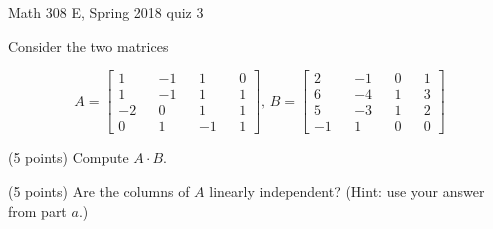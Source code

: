 \documentclass{exam}
\begin{document}
 
\begin{center} \begin{Large} Math 308 E, Spring 2018 quiz 3 \end{Large}
\end{center} 

\vspace{5mm}

\begin{center}
\end{center}

\vspace{1cm}
 

\vspace{1cm}

Consider the two matrices

\[
A = \begin{bmatrix} 1 && -1 && 1 && 0 \\ 1 && -1 && 1 && 1 \\ -2 && 0 && 1 && 1 \\ 0 && 1 && -1 && 1 \end{bmatrix}, \, B = \begin{bmatrix} 2 && -1 && 0 && 1 \\ 6 && -4 && 1 && 3 \\ 5 && -3 && 1 && 2 \\ -1 && 1 && 0 && 0 \end{bmatrix}
\]

\begin{questions}
\question (5 points) Compute $A \cdot B$. 

\vfill

\question (5 points) Are the columns of $A$ linearly independent? (Hint: use your answer from part $a$.)

\vfill

\end{questions}
\end{document}
